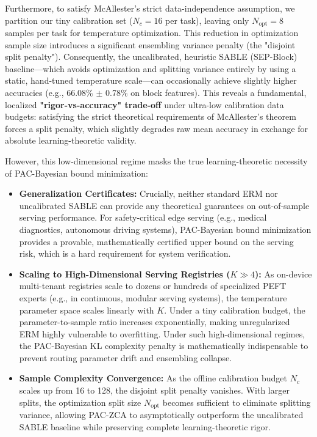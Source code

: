 Furthermore, to satisfy McAllester's strict data-independence assumption, we partition our tiny calibration set ($N_c = 16$ per task), leaving only $N_{\text{opt}} = 8$ samples per task for temperature optimization. This reduction in optimization sample size introduces a significant ensembling variance penalty (the "disjoint split penalty"). Consequently, the uncalibrated, heuristic SABLE (SEP-Block) baseline—which avoids optimization and splitting variance entirely by using a static, hand-tuned temperature scale—can occasionally achieve slightly higher accuracies (e.g., 66.08\% $\pm$ 0.78\% on block features). This reveals a fundamental, localized \textbf{"rigor-vs-accuracy" trade-off} under ultra-low calibration data budgets: satisfying the strict theoretical requirements of McAllester's theorem forces a split penalty, which slightly degrades raw mean accuracy in exchange for absolute learning-theoretic validity.

However, this low-dimensional regime masks the true learning-theoretic necessity of PAC-Bayesian bound minimization:
\begin{itemize}
    \item \textbf{Generalization Certificates:} Crucially, neither standard ERM nor uncalibrated SABLE can provide any theoretical guarantees on out-of-sample serving performance. For safety-critical edge serving (e.g., medical diagnostics, autonomous driving systems), PAC-Bayesian bound minimization provides a provable, mathematically certified upper bound on the serving risk, which is a hard requirement for system verification.
    \item \textbf{Scaling to High-Dimensional Serving Registries ($K \gg 4$):} As on-device multi-tenant registries scale to dozens or hundreds of specialized PEFT experts (e.g., in continuous, modular serving systems), the temperature parameter space scales linearly with $K$. Under a tiny calibration budget, the parameter-to-sample ratio increases exponentially, making unregularized ERM highly vulnerable to overfitting. Under such high-dimensional regimes, the PAC-Bayesian KL complexity penalty is mathematically indispensable to prevent routing parameter drift and ensembling collapse.
    \item \textbf{Sample Complexity Convergence:} As the offline calibration budget $N_c$ scales up from 16 to 128, the disjoint split penalty vanishes. With larger splits, the optimization split size $N_{\text{opt}}$ becomes sufficient to eliminate splitting variance, allowing PAC-ZCA to asymptotically outperform the uncalibrated SABLE baseline while preserving complete learning-theoretic rigor.
\end{itemize}

